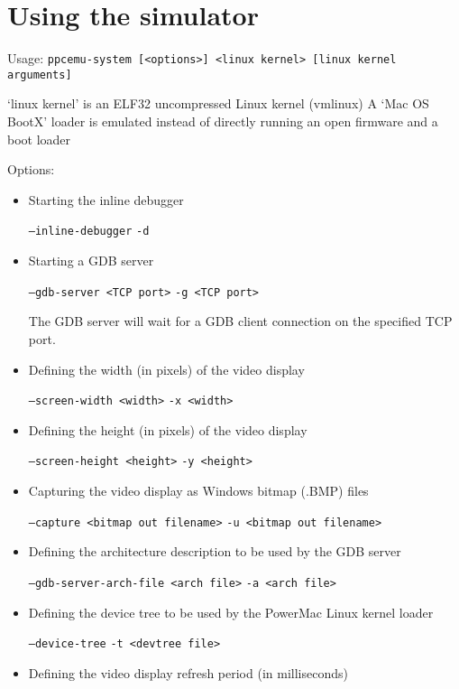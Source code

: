 \section{Using the simulator}

Usage: \texttt{ppcemu-system [<options>] <linux kernel> [linux kernel arguments]}

‘linux kernel’ is an ELF32 uncompressed Linux kernel (vmlinux) A ‘Mac OS BootX’ loader is emulated instead of directly running an open firmware and a boot loader

Options:

\begin{itemize}

\item Starting the inline debugger

\texttt{--inline-debugger}
\texttt{-d}

\item Starting a GDB server

\texttt{--gdb-server <TCP port>}
\texttt{-g <TCP port>}

The GDB server will wait for a GDB client connection on the specified TCP port.

\item Defining the width (in pixels) of the video display

\texttt{--screen-width <width>}
\texttt{-x <width>}

\item Defining the height (in pixels) of the video display

\texttt{--screen-height <height>}
\texttt{-y <height>}

\item Capturing the video display as Windows bitmap (.BMP) files

\texttt{--capture <bitmap out filename>}
\texttt{-u <bitmap out filename>}

\item Defining the architecture description to be used by the GDB server

\texttt{--gdb-server-arch-file <arch file>}
\texttt{-a  <arch file>}

\item Defining the device tree to be used by the PowerMac Linux kernel loader

\texttt{--device-tree}
\texttt{-t  <devtree file>}

\item Defining the video display refresh period (in milliseconds)


\end{itemize}
